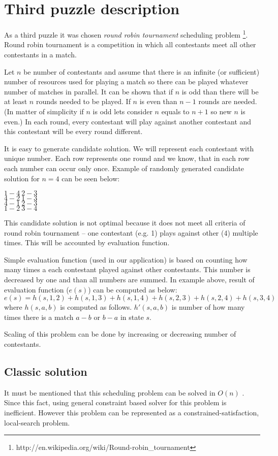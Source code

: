 \section{Third puzzle description}
As a third puzzle it was chosen \emph{round robin tournament} scheduling problem \footnote{http://en.wikipedia.org/wiki/Round-robin\_tournament}.
Round robin tournament is a competition in which all contestants meet all other contestants in a match.

Let $n$ be number of contestants and assume that there is an infinite (or sufficient) number of resources used for playing a match so there can be played whatever number of matches in parallel.
 It can be shown \cite{art} that if $n$ is odd than there will be at least $n$ rounds needed to be played. 
If $n$ is even than $n-1$ rounds are needed.
(In matter of simplicity if $n$ is odd lets consider $n$ equals to $n + 1$ so new $n$ is even.)
In each round, every contestant will play against another contestant and this contestant will be every round different.

It is easy to generate candidate solution. 
We will represent each contestant with unique number.
Each row represents one round and we know, that in each row each number can occur only once.
Example of randomly generated candidate solution for $n = 4$ can be seen below:
\begin{center}
$1-4\ 2-3$\\
$4-2\ 1-3$\\
$4-1\ 2-3$\\
$1-2\ 3-4$\\
\end{center}

This candidate solution is not optimal because it does not meet all criteria of round robin tournament -- one contestant (e.g. 1) plays against other (4) multiple times.
This will be accounted by evaluation function.

Simple evaluation function (used in our application) is based on counting how many times a each contestant played against other contestants. This number is decreased by one and than all numbers are summed. In example above, result of evaluation function ($e(s)$) can be computed as below:
$$e(s)  = h(s,1,2) + h(s,1,3) + h(s,1,4)  + h(s,2,3) + h(s,2,4) + h(s,3,4)$$
where $h(s,a,b)$ is computed as follows. $h'(s,a,b)$ is number of how many times there is a match $a-b$ or $b-a$ in state $s$. 

Scaling of this problem can be done by increasing or decreasing number of contestants.

\subsection{Classic solution}
It must be mentioned that this scheduling problem can be solved in $O(n)$ \cite{wiki}. 
Since this fact, using general constraint based solver for this problem is inefficient.
However this problem can be represented as a constrained-satisfaction, local-search problem.